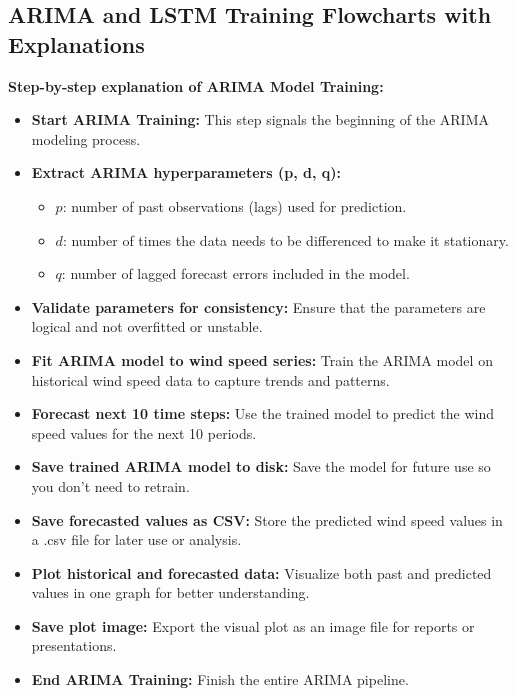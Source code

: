 \subsection{ARIMA and LSTM Training Flowcharts with Explanations}

\textbf{Step-by-step explanation of ARIMA Model Training:}

\begin{itemize}
	\item \textbf{Start ARIMA Training:} This step signals the beginning of the ARIMA modeling process.
	\item \textbf{Extract ARIMA hyperparameters (p, d, q):}
	\begin{itemize}
		\item \(p\): number of past observations (lags) used for prediction.
		\item \(d\): number of times the data needs to be differenced to make it stationary.
		\item \(q\): number of lagged forecast errors included in the model.
	\end{itemize}
	\item \textbf{Validate parameters for consistency:} Ensure that the parameters are logical and not overfitted or unstable.
	\item \textbf{Fit ARIMA model to wind speed series:} Train the ARIMA model on historical wind speed data to capture trends and patterns.
	\item \textbf{Forecast next 10 time steps:} Use the trained model to predict the wind speed values for the next 10 periods.
	\item \textbf{Save trained ARIMA model to disk:} Save the model for future use so you don’t need to retrain.
	\item \textbf{Save forecasted values as CSV:} Store the predicted wind speed values in a .csv file for later use or analysis.
	\item \textbf{Plot historical and forecasted data:} Visualize both past and predicted values in one graph for better understanding.
	\item \textbf{Save plot image:} Export the visual plot as an image file for reports or presentations.
	\item \textbf{End ARIMA Training:} Finish the entire ARIMA pipeline.
\end{itemize}

